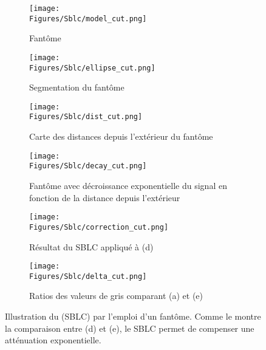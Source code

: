 \documentclass[\main/main.tex]{subfiles}
\begin{document}
\begin{figure}

    \centering
    \begin{subfigure}[b]{0.30\textwidth}
       \caption{
        \centering
            \label{fig:sblc:algo:model}
            Fantôme
            }
       \centering \texttt{[image: \\Figures/Sblc/model\_cut.png]}
    \end{subfigure}
    \begin{subfigure}[b]{0.30\textwidth}
       \caption{
        \centering
            \label{fig:sblc:algo:ellipse}
            Segmentation du fantôme
            }
       \centering \texttt{[image: \\Figures/Sblc/ellipse\_cut.png]}
    \end{subfigure}
    \begin{subfigure}[b]{0.30\textwidth}
       \caption{
        \centering
            \label{fig:sblc:algo:dist}
            Carte des distances depuis l'extérieur du fantôme
            }
       \centering \texttt{[image: \\Figures/Sblc/dist\_cut.png]}
    \end{subfigure}
    \begin{subfigure}[b]{0.30\textwidth}
       \caption{
        \centering
            \label{fig:sblc:algo:decay}
            Fantôme avec décroissance exponentielle du signal en fonction de la distance depuis l'extérieur
            }
       \centering \texttt{[image: \\Figures/Sblc/decay\_cut.png]}
    \end{subfigure}
    \begin{subfigure}[b]{0.30\textwidth}
       \caption{
        \centering
            \label{fig:sblc:algo:correction}
            Résultat du SBLC appliqué à (d)
            }
       \centering \texttt{[image: \\Figures/Sblc/correction\_cut.png]}
    \end{subfigure}
    \begin{subfigure}[b]{0.30\textwidth}
       \caption{
        \centering
            \label{fig:sblc:algo:ratio}
            Ratios des valeurs de gris comparant (a) et (e)
            }
       \centering \texttt{[image: \\Figures/Sblc/delta\_cut.png]}
    \end{subfigure}
    \caption{
        \label{fig:sblc:algo}
        Illustration du \sblc{} (SBLC) par l'emploi d'un fantôme.
        \newline
        Comme le montre la comparaison entre (d) et (e), le SBLC permet de compenser une atténuation exponentielle.
    }
\end{figure}
\end{document}
